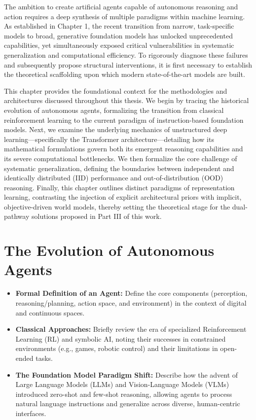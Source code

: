 The ambition to create artificial agents capable of autonomous reasoning and action requires a deep synthesis of multiple paradigms within machine learning. As established in Chapter 1, the recent transition from narrow, task-specific models to broad, generative foundation models has unlocked unprecedented capabilities, yet simultaneously exposed critical vulnerabilities in systematic generalization and computational efficiency. To rigorously diagnose these failures and subsequently propose structural interventions, it is first necessary to establish the theoretical scaffolding upon which modern state-of-the-art models are built. 

This chapter provides the foundational context for the methodologies and architectures discussed throughout this thesis. We begin by tracing the historical evolution of autonomous agents, formalizing the transition from classical reinforcement learning to the current paradigm of instruction-based foundation models. Next, we examine the underlying mechanics of unstructured deep learning---specifically the Transformer architecture---detailing how its mathematical formulations govern both its emergent reasoning capabilities and its severe computational bottlenecks. We then formalize the core challenge of systematic generalization, defining the boundaries between independent and identically distributed (IID) performance and out-of-distribution (OOD) reasoning. Finally, this chapter outlines distinct paradigms of representation learning, contrasting the injection of explicit architectural priors with implicit, objective-driven world models, thereby setting the theoretical stage for the dual-pathway solutions proposed in Part III of this work.

\section{The Evolution of Autonomous Agents}
\begin{itemize}
    \item \textbf{Formal Definition of an Agent:} Define the core components (perception, reasoning/planning, action space, and environment) in the context of digital and continuous spaces.
    \item \textbf{Classical Approaches:} Briefly review the era of specialized Reinforcement Learning (RL) and symbolic AI, noting their successes in constrained environments (e.g., games, robotic control) and their limitations in open-ended tasks.
    \item \textbf{The Foundation Model Paradigm Shift:} Describe how the advent of Large Language Models (LLMs) and Vision-Language Models (VLMs) introduced zero-shot and few-shot reasoning, allowing agents to process natural language instructions and generalize across diverse, human-centric interfaces.
\end{itemize}

